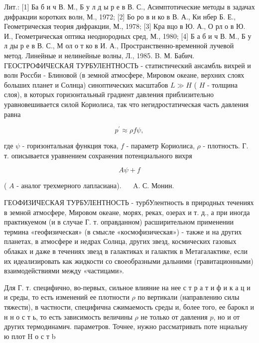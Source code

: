 \documentclass[10pt]{article}
\begin{document}
Лит.: [1] Ба б и ч В. М., Б у л д ы р е в В. С., Асимптотические методы в задачах дифракции коротких волн, М., 1972; [2] Бо ро в и ко в В. А., Ки нбер Б. Е., Геометрическая теория дифракции, М., 1978; [3] Кра вцо в Ю. А., О рл о в Ю. И., Геометрическая оптика неоднородных сред, М., 1980; [4] Б а б и ч В. М., Б у л ды р е в В. С., М ол о т ко в И. А., Пространственно-временной лучевой метод. Линейные и нелинейные волны, Л., 1985. B. М. Бабич. ГЕОСТРОФИЧЕСКАЯ ТУРБУЛЕНТНОСТЬ - статистический ансамбль вихрей и волн Россби - Блиновой (в земной атмосфере, Мировом океане, верхних слоях больших планет и Солнца) синоптических масштабов $L \gg H$ ( $H$ - толщина слоя), в которых горизонтальный градиент давления приблизительно уравновешивается силой Кориолиса, так что негидростатическая часть давления равна



\[

p^{\prime} \approx \rho f \psi,

\]



где $\psi$ - горизонтальная функция тока, $f$ - параметр Кориолиса, $\rho$ - плотность. Г. т. описывается уравнением сохранения потенциального вихря



\[

A \psi+f

\]



( $A$ - аналог трехмерного лапласиана). $\quad$ A. С. Монин.



ГЕОФИЗИЧЕСКАЯ ТУРБУЛЕНТНОСТЬ - турбУлентность в природных течениях в земной атмосфере, Мировом океане, морях, реках, озерах и т. д., а при иногда практикуемом (и в случае Г. т. оправданном) расширительном применении термина «геофизическая» (в смысле «космофизическая») - также и на других планетах, в атмосфере и недрах Солнца, других звезд, космических газовых облаках и даже в течениях звезд в галактиках и галактик в Метагалактике, если их идеализировать как жидкости со своеобразными дальними (гравитационными) взаимодействиями между «частицами».



Для Г. т. специфично, во-первых, сильное влияние на нее с т р а т и ф и к а ц и и среды, то есть изменений ее плотности $\rho$ по вертикали (направлению силы тяжести), в частности, специфична сжимаемость среды и, более того, ее барокл и н н о с т ь, то есть зависимость величины $\rho$ не только от давления $p$, но и от других термодинамич. параметров. Точнее, нужно рассматривать поте нциальну ю плот H о с т b
\end{document}
